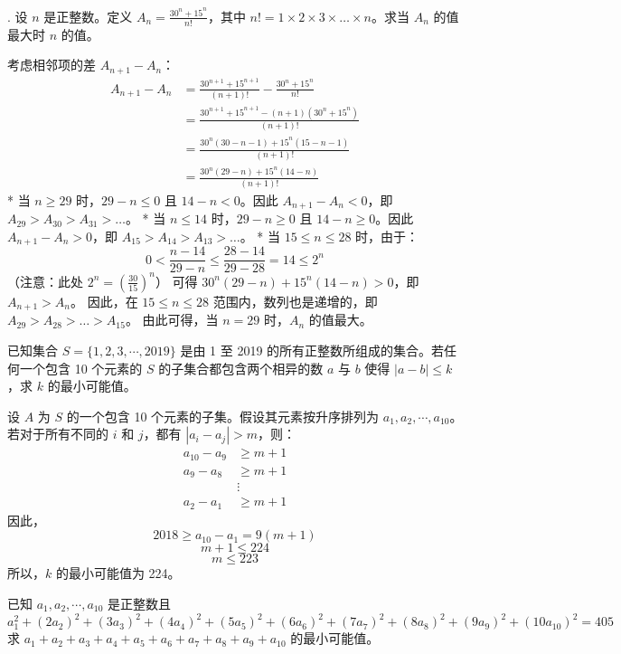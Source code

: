 \begin{questions}
. 设 $n$ 是正整数。定义 $A_n = \frac{30^n + 15^n}{n!}$，其中 $n! = 1 \times 2 \times 3 \times \dots \times n$。求当 $A_n$ 的值最大时 $n$ 的值。

\begin{solution}
考虑相邻项的差 $A_{n+1} - A_n$：
\begin{align*}
A_{n+1} - A_n &= \frac{30^{n+1} + 15^{n+1}}{(n+1)!} - \frac{30^n + 15^n}{n!} \\
&= \frac{30^{n+1} + 15^{n+1} - (n+1)(30^n + 15^n)}{(n+1)!} \\
&= \frac{30^n(30 - n - 1) + 15^n(15 - n - 1)}{(n+1)!} \\
&= \frac{30^n(29 - n) + 15^n(14 - n)}{(n+1)!}
\end{align*}
* 当 $n \ge 29$ 时，$29 - n \le 0$ 且 $14 - n < 0$。因此 $A_{n+1} - A_n < 0$，即 $A_{29} > A_{30} > A_{31} > \dots$。
* 当 $n \le 14$ 时，$29 - n \ge 0$ 且 $14 - n \ge 0$。因此 $A_{n+1} - A_n > 0$，即 $A_{15} > A_{14} > A_{13} > \dots$。
* 当 $15 \le n \le 28$ 时，由于：
\[
0 < \frac{n-14}{29-n} \le \frac{28-14}{29-28} = 14 \le 2^n
\]
（注意：此处 $2^n = \left( \frac{30}{15} \right)^n$）
可得 $30^n(29-n) + 15^n(14-n) > 0$，即 $A_{n+1} > A_n$。
因此，在 $15 \le n \le 28$ 范围内，数列也是递增的，即 $A_{29} > A_{28} > \dots > A_{15}$。
由此可得，当 $n = 29$ 时，$A_n$ 的值最大。
\end{solution}

\question 已知集合 $S = \{1, 2, 3, \cdots, 2019\}$ 是由 1 至 2019 的所有正整数所组成的集合。若任何一个包含 10 个元素的 $S$ 的子集合都包含两个相异的数 $a$ 与 $b$ 使得 $|a - b| \le k$，求 $k$ 的最小可能值。

\begin{solution}
设 $A$ 为 $S$ 的一个包含 10 个元素的子集。假设其元素按升序排列为 $a_1, a_2, \cdots, a_{10}$。若对于所有不同的 $i$ 和 $j$，都有 $|a_i - a_j| > m$，则：
\begin{align*}
a_{10} - a_9 &\ge m + 1 \\
a_9 - a_8 &\ge m + 1 \\
&\vdots \\
a_2 - a_1 &\ge m + 1
\end{align*}
因此，
\[
2018 \ge a_{10} - a_1 = 9(m + 1)
\]
\[
m + 1 \le 224
\]
\[
m \le 223
\]
所以，$k$ 的最小可能值为 224。
\end{solution}

\question 已知 $a_1, a_2, \cdots, a_{10}$ 是正整数且
\[ a_1^2 + (2a_2)^2 + (3a_3)^2 + (4a_4)^2 + (5a_5)^2 + (6a_6)^2 + (7a_7)^2 + (8a_8)^2 + (9a_9)^2 + (10a_{10})^2 = 405 \]
求 $a_1 + a_2 + a_3 + a_4 + a_5 + a_6 + a_7 + a_8 + a_9 + a_{10}$ 的最小可能值。


\end{questions}

